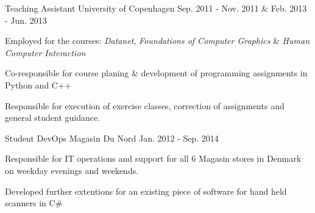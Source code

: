 \begin{cventries}
\cventry
{Teaching Assistant} %
{University of Copenhagen} %
{} %
{Sep. 2011 - Nov. 2011 \& Feb. 2013 - Jun. 2013} %
{ %
\begin{cvitems}
\item {Employed for the courses: \textit{Datanet}, \textit{Foundations of Computer Graphics} \& \textit{Human Computer Interaction}}
\item {Co-responsible for course planing \& development of programming assignments in Python and C++}
\item {Responsible for execution of exercise classes, correction of assignments and general student guidance.}
\end{cvitems}
}
\cventry
{Student DevOps} %
{Magasin Du Nord} %
{} %
{Jan. 2012 - Sep. 2014} %
{ %
\begin{cvitems}
\item {Responsible for IT operations and support for all 6 Magasin stores in Denmark on weekday evenings and weekends.}
\item {Developed further extentions for an existing piece of software for hand held scanners in C\#}
\end{cvitems}
}


\end{cventries}
